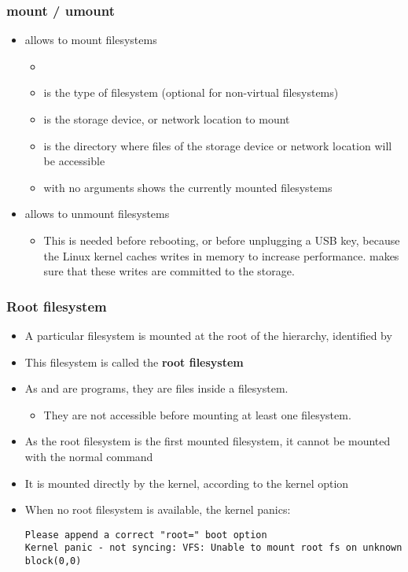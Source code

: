 \begin{frame}
  \frametitle{mount / umount}
  \begin{itemize}
  \item {} allows to mount filesystems
    \begin{itemize}
    \item {}
    \item {} is the type of filesystem (optional for
	non-virtual filesystems)
    \item {} is the storage device, or network location to
      mount
    \item {} is the directory where files of the
      storage device or network location will be accessible
    \item {} with no arguments shows the currently mounted
      filesystems
    \end{itemize}
  \item {} allows to unmount filesystems
    \begin{itemize}
    \item This is needed before rebooting, or before unplugging a USB
      key, because the Linux kernel caches writes in memory to
      increase performance.  makes sure that these writes are
      committed to the storage.
    \end{itemize}
  \end{itemize}
\end{frame}

\begin{frame}[fragile]
  \frametitle{Root filesystem}
  \begin{itemize}
  \item A particular filesystem is mounted at the root of the hierarchy,
    identified by \code{/}
  \item This filesystem is called the {\bf root filesystem}
  \item As  and  are programs, they are files
    inside a filesystem.
    \begin{itemize}
    \item They are not accessible before mounting at least one filesystem.
    \end{itemize}
  \item As the root filesystem is the first mounted filesystem, it
    cannot be mounted with the normal  command
  \item It is mounted directly by the kernel, according to the
     kernel option
  \item When no root filesystem is available, the kernel panics:\\
    \small
\begin{verbatim}
Please append a correct "root=" boot option
Kernel panic - not syncing: VFS: Unable to mount root fs on unknown block(0,0)
\end{verbatim}
  \end{itemize}
\end{frame}

